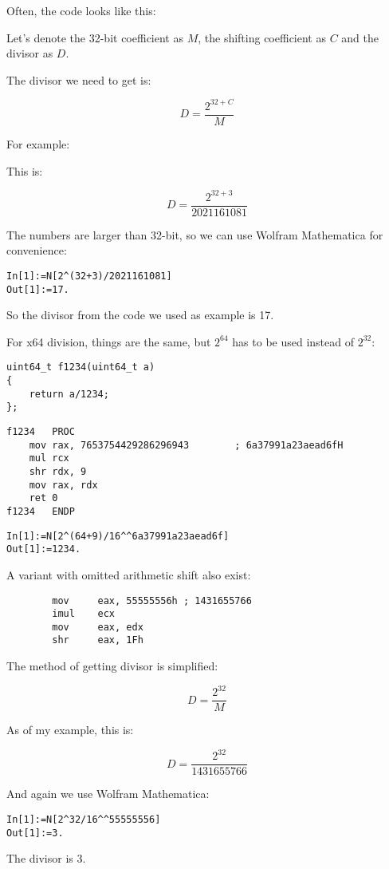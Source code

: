 ﻿


Often, the code looks like this:



Let's denote the 32-bit  coefficient as $M$, the shifting coefficient as $C$ and the divisor as $D$.

The divisor we need to get is:

\[
D=\frac{2^{32 + C}}{M}
\]

For example:



This is:

\[
D=\frac{2^{32 + 3}}{2021161081}
\]


The numbers are larger than 32-bit, so we can use Wolfram Mathematica for convenience:

\begin{lstlisting}[caption=Wolfram Mathematica]
In[1]:=N[2^(32+3)/2021161081]
Out[1]:=17.
\end{lstlisting}

So the divisor from the code we used as example is 17.

For x64 division, things 
are the same, but $2^{64}$ has to be used instead of $2^{32}$:

\begin{lstlisting}
uint64_t f1234(uint64_t a)
{
	return a/1234;
};
\end{lstlisting}

\begin{lstlisting}[caption=\Optimizing MSVC 2012 x64]
f1234	PROC
	mov	rax, 7653754429286296943		; 6a37991a23aead6fH
	mul	rcx
	shr	rdx, 9
	mov	rax, rdx
	ret	0
f1234	ENDP
\end{lstlisting}

\begin{lstlisting}[caption=Wolfram Mathematica]
In[1]:=N[2^(64+9)/16^^6a37991a23aead6f]
Out[1]:=1234.
\end{lstlisting}


A variant with omitted arithmetic shift also exist:

\begin{lstlisting}
		mov     eax, 55555556h ; 1431655766
		imul    ecx
		mov     eax, edx
		shr     eax, 1Fh
\end{lstlisting}

The method of getting divisor is simplified:

\[
D=\frac{2^{32}}{M}
\]

As of my example, this is:

\[
D=\frac{2^{32}}{1431655766}
\]


And again we use Wolfram Mathematica:

\begin{lstlisting}[caption=Wolfram Mathematica]
In[1]:=N[2^32/16^^55555556]
Out[1]:=3.
\end{lstlisting}

The divisor is 3.
